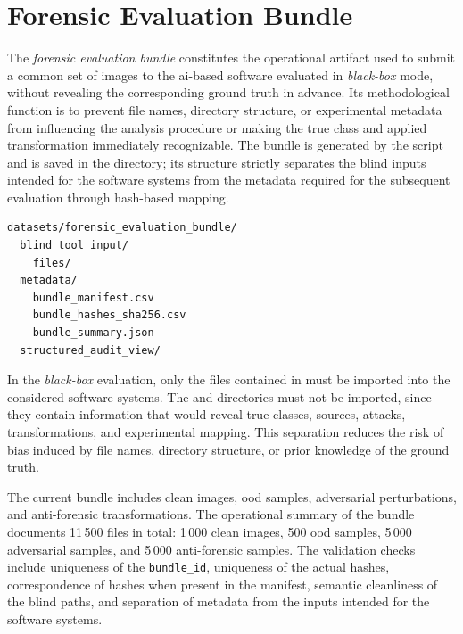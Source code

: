 \section{Forensic Evaluation Bundle}
\label{app:forensic-evaluation-bundle}

The \textit{forensic evaluation bundle} constitutes the operational artifact
used to submit a common set of images to the \gls{ai}-based software evaluated
in \textit{black-box} mode, without revealing the corresponding ground truth in
advance. Its methodological function is to prevent file names, directory
structure, or experimental metadata from influencing the analysis procedure or
making the true class and applied transformation immediately recognizable. The
bundle is generated by the script
 and is
saved in the  directory; its
structure strictly separates the blind inputs intended for the software systems
from the metadata required for the subsequent evaluation through hash-based
mapping.

\begin{lstlisting}[caption={Logical structure of the forensic evaluation bundle.}, label={lst:forensic-evaluation-bundle-structure}]
datasets/forensic_evaluation_bundle/
  blind_tool_input/
    files/
  metadata/
    bundle_manifest.csv
    bundle_hashes_sha256.csv
    bundle_summary.json
  structured_audit_view/
\end{lstlisting}

In the \textit{black-box} evaluation, only the files contained in
 must be imported into the considered
software systems. The  and
 directories must not be imported, since they
contain information that would reveal true classes, sources, attacks,
transformations, and experimental mapping. This separation reduces the risk of
bias induced by file names, directory structure, or prior knowledge of the
ground truth.

The current bundle includes clean images, \gls{ood} samples, adversarial
perturbations, and anti-forensic transformations. The operational summary of the
bundle documents 11\,500 files in total: 1\,000 clean images, 500 \gls{ood}
samples, 5\,000 adversarial samples, and 5\,000 anti-forensic samples. The
validation checks include uniqueness of the \texttt{bundle\_id}, uniqueness of
the actual hashes, correspondence of hashes when present in the manifest,
semantic cleanliness of the blind paths, and separation of metadata from the
inputs intended for the software systems.


